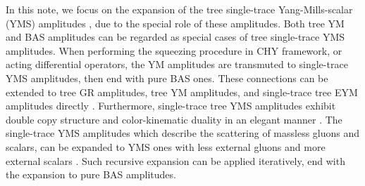 \documentclass[preprint,showpacs,onecolumn,nofootinbib]{revtex4}
\begin{document}
In this note, we focus on the expansion of the tree single-trace Yang-Mills-scalar (YMS) amplitudes \cite{Stieberger:2016lng,Schlotterer:2016cxa,Chiodaroli:2014xia,Chiodaroli:2017ngp,DelDuca:1999rs,Nandan:2016pya,delaCruz:2016gnm}, due to the special role of these amplitudes. Both tree YM and BAS amplitudes can be regarded as special cases of tree single-trace YMS amplitudes. When performing the squeezing procedure in CHY framework, or acting differential operators, the YM amplitudes are transmuted to single-trace YMS amplitudes, then end with pure BAS ones. These connections can be extended to tree GR amplitudes, tree YM amplitudes, and single-trace tree EYM amplitudes directly \cite{Cachazo:2013iea,Cachazo:2014nsa,Cachazo:2014xea,Zhou:2018wvn,Bollmann:2018edb}.
Furthermore, single-trace tree YMS amplitudes exhibit double copy structure and color-kinematic duality in an elegant manner \cite{Cachazo:2013iea,Cachazo:2014nsa,Cachazo:2014xea,Cheung:2021zvb,Chiodaroli:2014xia,Chiodaroli:2017ngp}.
The single-trace YMS amplitudes which describe the scattering of massless gluons and scalars, can be expanded to YMS ones with less external gluons and more external scalars \cite{Fu:2017uzt,Teng:2017tbo,Du:2017kpo,Du:2017gnh,Feng:2019tvb,Zhou:2022orv}.
Such recursive expansion can be applied iteratively, end with the expansion to pure BAS amplitudes.
\end{document}
